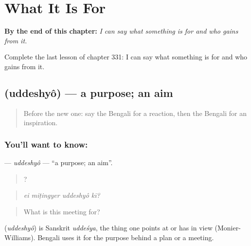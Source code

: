 
\chapter{What It Is For}
\label{ch:bn-what-it-is-for}

\begin{chapteropening}
\textbf{By the end of this chapter:} \emph{I can say what something is for and who gains from it.}

Complete the last lesson of chapter 331: I can say what something is for and who gains from it.
\end{chapteropening}

\section[\texorpdfstring{\bn{উদ্দেশ্য} (uddeshyô)}{উদ্দেশ্য (uddeshyô)}]{ (uddeshyô) — a purpose; an aim}

\label{lesson:BN-C331-uddeshyo}



\begin{quote}
Before the new one: say the Bengali for a reaction, then the Bengali for an inspiration.
\end{quote}

\subsection*{You'll want to know: }
\textbf{} — \emph{uddeshyô} — \textquotedblleft{}a purpose; an aim\textquotedblright{}.

\begin{quote}
   ?
\end{quote}

\begin{quote}
\emph{ei miṭingyer uddeshyô kī?}
\end{quote}

\begin{quote}
What is this meeting for?
\end{quote}

\begin{cousinweb}
\textbf{} (\emph{uddeshyô}) is Sanskrit \emph{uddeśya}, the thing one points at or has in view (Monier-Williams). Bengali uses it for the purpose behind a plan or a meeting.
\end{cousinweb}

